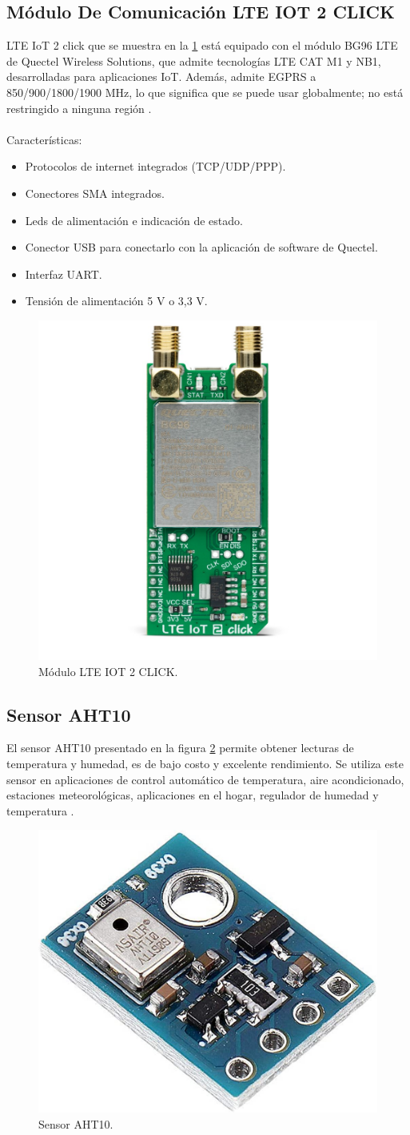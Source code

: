 \subsection{Módulo De Comunicación LTE IOT 2 CLICK}
\label{subsec:ejemplo}
LTE IoT 2 click que se muestra en la \ref{fig:modulo LTE IOT} está equipado con el módulo BG96 LTE de Quectel Wireless Solutions, que admite tecnologías LTE CAT M1 y NB1, desarrolladas para aplicaciones IoT. Además, admite EGPRS a 850/900/1800/1900 MHz, lo que significa que se puede usar globalmente; no está restringido a ninguna región \citep{MonuloLTE-IOT}.
\\ 
\\Características:
\begin{itemize}
	\item Protocolos de internet integrados (TCP/UDP/PPP).
	\item Conectores SMA integrados.
	\item Leds de alimentación e indicación de estado.
	\item Conector USB para conectarlo con la aplicación de software de Quectel.
	\item Interfaz UART. 
	\item Tensión de alimentación 5 V o 3,3 V.

\end{itemize}


\begin{figure}[htbp]
	\centering
	\includegraphics[width=.4\textwidth]{./Figures/moduloBG96.jpg}
	\caption{Módulo LTE IOT 2 CLICK.}
	\label{fig:modulo LTE IOT}
\end{figure}
\subsection{Sensor AHT10}
El sensor AHT10 presentado en la figura \ref{fig:SensorAHT10} permite obtener lecturas de temperatura y humedad, es de bajo costo y excelente rendimiento. Se utiliza este sensor en aplicaciones de control automático de temperatura, aire acondicionado, estaciones meteorológicas, aplicaciones en el hogar, regulador de humedad y temperatura \citep{ModuloAHT10}.
\begin{figure}[htbp]
	\centering
	\includegraphics[width=.3\textwidth]{./Figures/aht10.jpg}
	\caption{Sensor AHT10.}
	\label{fig:SensorAHT10}
\end{figure}

